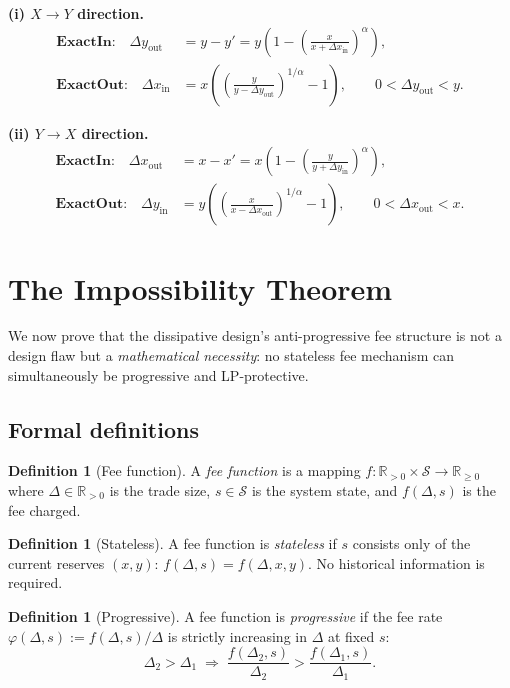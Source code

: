 \documentclass[11pt]{article}
\theoremstyle{definition}
\newtheorem{definition}[theorem]{Definition}
\theoremstyle{remark}
\newcommand{\R}{\mathbb{R}}
\newcommand{\Rp}{\R_{>0}}
\newcommand{\dx}{\Delta x}
\newcommand{\dy}{\Delta y}
\begin{document}
\textbf{(i) \(X \to Y\) direction.}
\begin{align}
\textbf{ExactIn:}\quad
\dy_{\mathrm{out}}
&= y - y'
= y\left(1 - \left(\frac{x}{x+\dx_{\mathrm{in}}}\right)^{\alpha}\right),
\\[4pt]
\textbf{ExactOut:}\quad
\dx_{\mathrm{in}}
&= x\left(\left(\frac{y}{y-\dy_{\mathrm{out}}}\right)^{1/\alpha}-1\right),
\qquad 0<\dy_{\mathrm{out}}<y.
\end{align}

\textbf{(ii) \(Y \to X\) direction.}
\begin{align}
\textbf{ExactIn:}\quad
\dx_{\mathrm{out}}
&= x - x'
= x\left(1 - \left(\frac{y}{y+\dy_{\mathrm{in}}}\right)^{\alpha}\right),
\\[4pt]
\textbf{ExactOut:}\quad
\dy_{\mathrm{in}}
&= y\left(\left(\frac{x}{x-\dx_{\mathrm{out}}}\right)^{1/\alpha}-1\right),
\qquad 0<\dx_{\mathrm{out}}<x.
\end{align}

\section{The Impossibility Theorem}\label{sec:impossibility}

We now prove that the dissipative design's anti-progressive fee structure is not a design flaw but a \emph{mathematical necessity}: no stateless fee mechanism can simultaneously be progressive and LP-protective.

\subsection{Formal definitions}

\begin{definition}[Fee function]
A \emph{fee function} is a mapping $f:\Rp\times\mathcal{S}\to\R_{\ge 0}$ where $\Delta\in\Rp$ is the trade size, $s\in\mathcal{S}$ is the system state, and $f(\Delta,s)$ is the fee charged.
\end{definition}

\begin{definition}[Stateless]
A fee function is \emph{stateless} if $s$ consists only of the current reserves $(x,y)$:
$f(\Delta,s)=f(\Delta,x,y)$.
No historical information is required.
\end{definition}

\begin{definition}[Progressive]
A fee function is \emph{progressive} if the fee rate $\varphi(\Delta,s):=f(\Delta,s)/\Delta$ is strictly increasing in $\Delta$ at fixed $s$:
\[
\Delta_2 > \Delta_1 \;\Longrightarrow\; \frac{f(\Delta_2,s)}{\Delta_2} > \frac{f(\Delta_1,s)}{\Delta_1}.
\]
\end{definition}
\end{document}

